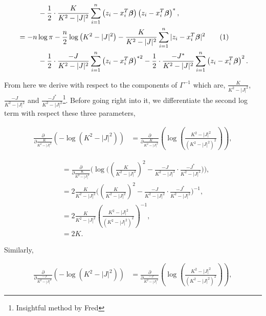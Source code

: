 \documentclass[honours,12pt]{unswthesis}
\newcommand{\covdet}{K^{2} - |J|^{2}}
\newcommand\numberthis{\addtocounter{equation}{1}\tag{\theequation}}
\numberwithin{equation}{section}
\begin{document}
\begin{align*}
    &\hspace{1cm} - \frac{1}{2} \cdot \frac{K}{K^{2} - |J|^{2}} \sum_{i=1}^{n} \left( z_{i} - x_{i}^{T} \bm{\beta} \right) \left( z_{i} - x_{i}^{T} \bm{\beta} \right)^{*},\\
    &= - n \log{ \pi } - \frac{n}{2} \log { \left( K^{2} - |J|^{2} \right) } - \frac{K}{K^{2} - |J|^{2}} \sum_{i=1}^{n} | z_{i} - x_{i}^{T} \bm{\beta} |^{2} \numberthis \label{expandedcovariance} \\
    &\hspace{1cm} - \frac{1}{2} \cdot \frac{-J}{K^{2} - |J|^{2}} \sum_{i=1}^{n} \left( z_{i} - x_{i}^{T} \bm{\beta} \right)^{*2} - \frac{1}{2} \cdot \frac{-J^{*}}{K^{2} - |J|^{2}} \sum_{i=1}^{n} \left( z_{i} - x_{i}^{T} \bm{\beta} \right)^{2}.
\end{align*}

\noindent From here we derive with respect to the components of $\Gamma^{-1}$ which are, $\frac{K}{K^{2} - |J|^{2}}$, $\frac{-J}{K^{2} - |J|^{2}}$ and $\frac{-J^{*}}{K^{2} - |J|^{2}}$\footnote{Insightful method by Fred}. Before going right into it, we differentiate the second log term with respect these three parameters,

\begin{align*}
    \frac{\partial}{\partial \frac{K}{\covdet}} \left( - \log{ \left( \covdet \right)} \right) &= \frac{\partial}{\partial \frac{K}{\covdet}} \left( \log{ \left( \frac{\covdet}{\left( \covdet \right)^{2}} \right)} \right),
\end{align*}

\begin{align*}
    &= \frac{\partial}{\partial \frac{K}{\covdet}} \Bigg( \log \Bigg( \left( \frac{K}{\covdet} \right)^{2} - \frac{-J}{\covdet} \cdot \frac{-J^{*}}{\covdet} \Bigg) \Bigg),\\
    &= 2 \frac{K}{\covdet} \Bigg( \left( \frac{K}{\covdet} \right)^{2} - \frac{-J}{\covdet} \cdot \frac{-J^{*}}{\covdet} \Bigg)^{-1}, \\
    &= 2 \frac{K}{\covdet} \left( \frac{\covdet}{\left( \covdet \right)^{2}} \right)^{-1},\\
    &= 2K.
\end{align*}

\noindent Similarly,

\begin{align*}
    \frac{\partial}{\partial \frac{-J}{\covdet}} \left( - \log{ \left( \covdet \right)} \right) &= \frac{\partial}{\partial \frac{-J}{\covdet}} \left( \log{ \left( \frac{\covdet}{\left( \covdet \right)^{2}} \right)} \right),
\end{align*}
\end{document}
